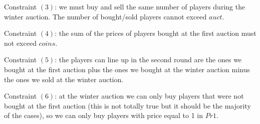 \documentclass[a4paper,10pt]{article}
\theoremstyle{definition}
\theoremstyle{plain}
\begin{document}
Constraint $(3)$: we must buy and sell the same number of players during the winter auction. The number of bought/sold players cannot exceed $auct$.

Constraint $(4)$: the sum of the prices of players bought at the first auction must not exceed $coins$.

Constraint $(5)$: the players can line up in the second round are the ones we bought at the first auction plus the ones we bought at the winter auction minus the ones we sold at the winter auction.

Constraint $(6)$: at the winter auction we can only buy players that were not bought at the first auction (this is not totally true but it should be the majority of the cases), so we can only buy players with price equal to 1 in $Pr1$.

	
	
	
	
\end{document}
